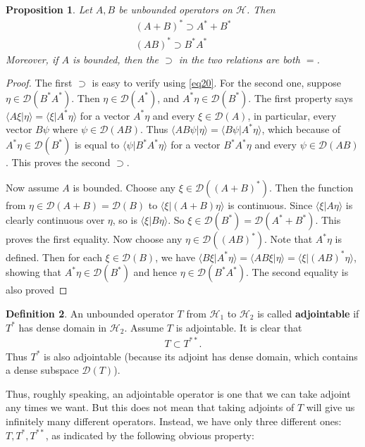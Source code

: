 \documentclass[12pt,b5paper,notitlepage]{article}
\theoremstyle{definition}
\newtheorem{df}{Definition}[section]
\theoremstyle{plain}
\newtheorem{pp}[df]{Proposition}
\newcommand{\mc}{\mathcal}
\newcommand{\Dom}{\scr D}
\newcommand{\bk}[1]{\langle {#1}\rangle}
\newcommand{\scr}{\mathscr}
\numberwithin{equation}{section}
\begin{document}
\begin{pp}\label{lb9}
Let $A,B$ be unbounded operators on $\mc H$. Then
\begin{gather*}
(A+B)^*\supset A^*+B^*\\
(AB)^*\supset B^*A^*
\end{gather*}
Moreover, if $A$ is bounded, then the $\supset$ in the two relations are both $=$.
\end{pp}


\begin{proof}
The first $\supset$ is easy to verify using \eqref{eq20}. For the second one, suppose $\eta\in\Dom(B^*A^*)$. Then $\eta\in\Dom(A^*)$, and $A^*\eta\in\Dom(B^*)$. The first property says $\bk{A\xi|\eta}=\bk{\xi|A^*\eta}$ for a vector $A^*\eta$ and every $\xi\in\Dom(A)$, in particular, every vector $B\psi$ where $\psi\in\Dom(AB)$. Thus $\bk{AB\psi|\eta}=\bk{B\psi|A^*\eta}$, which because of $A^*\eta\in\Dom(B^*)$ is equal to $\bk{\psi|B^*A^*\eta}$ for a vector $B^*A^*\eta$ and every $\psi\in\Dom(AB)$. This proves the second $\supset$.

Now assume $A$ is bounded. Choose any $\xi\in\Dom((A+B)^*)$. Then the function from $\eta\in\Dom(A+B)=\Dom(B)$ to $\bk{\xi|(A+B)\eta}$ is continuous. Since $\bk{\xi|A\eta}$ is clearly continuous over $\eta$, so is $\bk{\xi|B\eta}$. So $\xi\in\Dom(B^*)=\Dom(A^*+B^*)$. This proves the first equality. Now choose any $\eta\in\Dom((AB)^*)$. Note that $A^*\eta$ is defined. Then for each  $\xi\in\Dom(B)$, we have $\bk{B\xi|A^*\eta}=\bk{AB\xi|\eta}=\bk{\xi|(AB)^*\eta}$, showing that $A^*\eta\in\Dom(B^*)$ and hence $\eta\in\Dom(B^*A^*)$. The second equality is also proved
\end{proof}




\begin{df}
An unbounded operator $T$ from $\mc H_1$ to $\mc H_2$ is called \textbf{adjointable}  if $T^*$ has dense domain in $\mc H_2$. Assume $T$ is adjointable. It is clear that
\begin{align}
T\subset T^{**}.	
\end{align}
Thus $T^*$ is also adjointable (because its adjoint has dense domain, which contains a dense subspace $\Dom(T)$).
\end{df}

Thus, roughly speaking, an adjointable operator is one that we can take adjoint any times we want. But this does not mean that taking adjoints of $T$ will give us infinitely many different operators. Instead, we have only three different ones: $T,T^*,T^{**}$, as indicated by the following obvious property:
\end{document}
